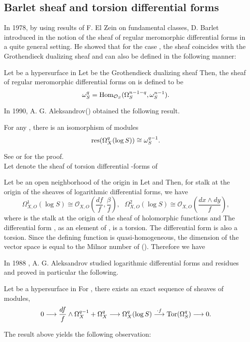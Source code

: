 \documentclass{arxsigma}
\begin{document}
\subsection{Barlet sheaf and torsion differential forms}
In 1978, by using results of F. El Zein on fundamental classes, D. Barlet introduced in \cite{B} the notion of the sheaf of regular meromorphic differential forms   in a
quite general setting. He showed that for the case  , the sheaf   coincides with the
Grothendieck dualizing sheaf and   can also be defined in the following manner:
\begin{definition}
Let   be a hypersurface
in   Let   be the Grothendieck dualizing sheaf   Then, the sheaf of regular meromorphic differential forms   on   is defined to be
\begin{equation*}
\omega_S^{q} ={\rm Hom}_{{\mathcal O}_S}(\Omega_S^{n-1-q}, \omega_S^{n-1}).
\end{equation*}
\end{definition}
In 1990, A. G. Aleksandrov(\cite{A}) obtained the following result.
\begin{theorem}
For any  , there is an isomorphism of   modules
\begin{equation*}{\rm res}(\Omega_X^{q}(\log S)) \cong \omega_S^{q-1}.
\end{equation*}
\end{theorem}
See \cite{A} or \cite{A05} for the proof.\\ Let   denote the sheaf of torsion differential  -forms of  
\begin{example}
Let   be an open neighborhood of the origin   in   Let   and   Then, for stalk at the origin of the sheaves of logarithmic differential forms, we have
\begin{equation*}
\Omega_{X,O}^{1}(\log S) \cong{\mathcal O}_{X,O}\left(\frac{df}{f}, \frac{\beta}{f}\right), \ \ \ \Omega_{X,O}^{2}(\log S) \cong{\mathcal O}_{X,O}\left(\frac{dx\wedge dy}{f}\right),
\end{equation*}
where   is the stalk at the origin of the sheaf   of holomorphic functions and
  The differential form  , as an element of  , is a torsion. The differential form   is also a torsion. Since the defining function   is quasi-homogeneous, the dimension of the vector space   is equal to the Milnor number   of   (\cite{M, Z}). Therefore we have
 
\end{example}
In 1988 \cite{A88}, A. G. Aleksandrov studied logarithmic differential forms and residues and proved in particular the following.
\begin{theorem}
Let   be a hypersurface in   For  , there exists an exact sequence of sheaves of   modules,
\begin{equation*}
0 \longrightarrow\frac{df}{f} \wedge \Omega_{X}^{q-1}+ \Omega_{X}^{q} \longrightarrow
\Omega_{X}^{q}(\log S) \stackrel{\cdot f}\longrightarrow{\rm Tor}(\Omega_{S}^{q}) \longrightarrow 0.
\end{equation*}
\end{theorem}
The result above yields the following observation:
 
\end{document}
